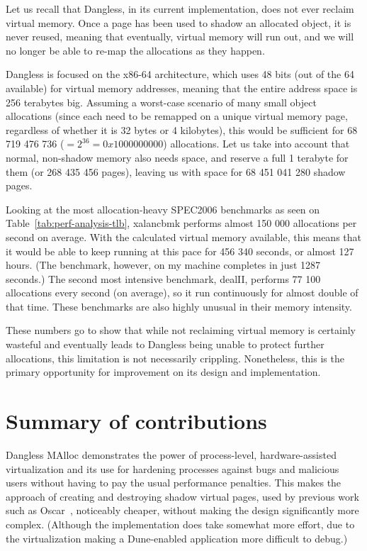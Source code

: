 Let us recall that Dangless, in its current implementation, does not ever reclaim virtual memory. Once a page has been used to shadow an allocated object, it is never reused, meaning that eventually, virtual memory will run out, and we will no longer be able to re-map the allocations as they happen.

Dangless is focused on the x86-64 architecture, which uses 48 bits (out of the 64 available) for virtual memory addresses, meaning that the entire address space is 256 terabytes big. Assuming a worst-case scenario of many small object allocations (since each need to be remapped on a unique virtual memory page, regardless of whether it is 32 bytes or 4 kilobytes), this would be sufficient for 68 719 476 736 ($= 2^{36} = 0x1000000000$) allocations. Let us take into account that normal, non-shadow memory also needs space, and reserve a full 1 terabyte for them (or 268 435 456 pages), leaving us with space for 68 451 041 280 shadow pages.

Looking at the most allocation-heavy SPEC2006 benchmarks as seen on Table~\ref{tab:perf-analysis-tlb}, xalancbmk performs almost 150 000 allocations per second on average. With the calculated virtual memory available, this means that it would be able to keep running at this pace for 456 340 seconds, or almost 127 hours. (The benchmark, however, on my machine completes in just 1287 seconds.) The second most intensive benchmark, dealII, performs 77 100 allocations every second (on average), so it run continuously for almost double of that time. These benchmarks are also highly unusual in their memory intensity.

These numbers go to show that while not reclaiming virtual memory is certainly wasteful and eventually leads to Dangless being unable to protect further allocations, this limitation is not necessarily crippling. Nonetheless, this is the primary opportunity for improvement on its design and implementation.

\section{Summary of contributions}


Dangless MAlloc demonstrates the power of process-level, hardware-assisted virtualization and its use for hardening processes against bugs and malicious users without having to pay the usual performance penalties. This makes the approach of creating and destroying shadow virtual pages, used by previous work such as Oscar~\cite{oscar2017}, noticeably cheaper, without making the design significantly more complex. (Although the implementation does take somewhat more effort, due to the virtualization making a Dune-enabled application more difficult to debug.)

